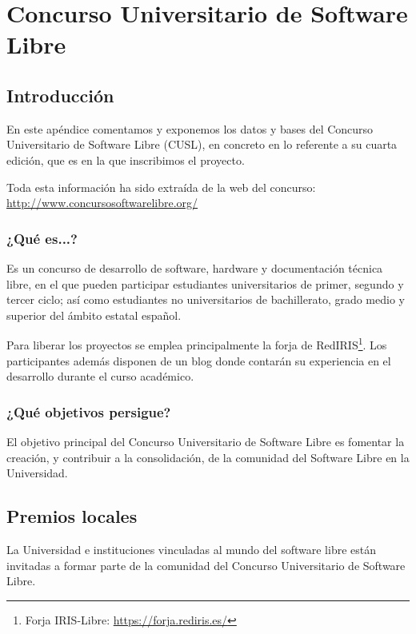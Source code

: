 \chapter*{Concurso Universitario de Software Libre} \label{ap2}

\vspace*{5mm}

\section*{Introducción}

En este apéndice comentamos y exponemos los datos y bases del Concurso
Universitario de Software Libre (CUSL), en concreto en lo referente a su cuarta
edición, que es en la que inscribimos el proyecto.

Toda esta información ha sido extraída de la web del concurso:
\url{http://www.concursosoftwarelibre.org/}

\subsection*{¿Qué es...?}

Es un concurso de desarrollo de software, hardware y documentación técnica
libre, en el que pueden participar estudiantes universitarios de primer,
segundo y tercer ciclo; así como estudiantes no universitarios de bachillerato,
grado medio y superior del ámbito estatal español.

Para liberar los proyectos se emplea principalmente la forja de
RedIRIS\footnote{Forja IRIS-Libre: \url{https://forja.rediris.es/}}. Los
participantes además disponen de un blog donde contarán su experiencia en el
desarrollo durante el curso académico.

\subsection*{¿Qué objetivos persigue?}

El objetivo principal del Concurso Universitario de Software Libre es fomentar
la creación, y contribuir a la consolidación, de la comunidad del Software Libre
en la Universidad.

\section*{Premios locales}

La Universidad e instituciones vinculadas al mundo del software libre están
invitadas a formar parte de la comunidad del Concurso Universitario de Software
Libre.

